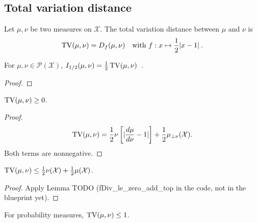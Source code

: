 \subsection{Total variation distance}

\begin{definition}[TV distance]
  \label{def:TV}
  \leanok
  Let $\mu, \nu$ be two measures on $\mathcal X$. The total variation distance between $\mu$ and $\nu$ is
  \begin{align*}
  \operatorname{TV}(\mu, \nu) = D_f(\mu, \nu) \quad \text{with } f: x \mapsto \frac{1}{2}\vert x - 1 \vert \: .
  \end{align*}
\end{definition}

\begin{lemma}
  \label{lem:deGrootInfo_half}
  For $\mu, \nu \in \mathcal P(\mathcal X)$, $I_{1/2}(\mu, \nu) = \frac{1}{2}\operatorname{TV}(\mu, \nu)$~.
\end{lemma}

\begin{proof}%
\uses{}

\end{proof}

\begin{lemma}
  \label{lem:tv_nonneg}
  $\operatorname{TV}(\mu, \nu) \ge 0$.
\end{lemma}

\begin{proof}
\begin{align*}
\operatorname{TV}(\mu, \nu)
= \frac{1}{2}\nu\left[ \vert \frac{d\mu}{d\nu} - 1 \vert \right] + \frac{1}{2}\mu_{\perp \nu}(\mathcal X).
\end{align*}
Both terms are nonnegative.
\end{proof}

\begin{lemma}
  \label{lem:tv_le_add}
  $\operatorname{TV}(\mu, \nu) \le \frac{1}{2}\nu(\mathcal X) + \frac{1}{2}\mu(\mathcal X)$.
\end{lemma}

\begin{proof}
Apply Lemma TODO (fDiv\_le\_zero\_add\_top in the code, not in the blueprint yet).
\end{proof}


\begin{lemma}
  \label{lem:tv_le_one}
  For probability measures,
  $\operatorname{TV}(\mu, \nu) \le 1$.
\end{lemma}

